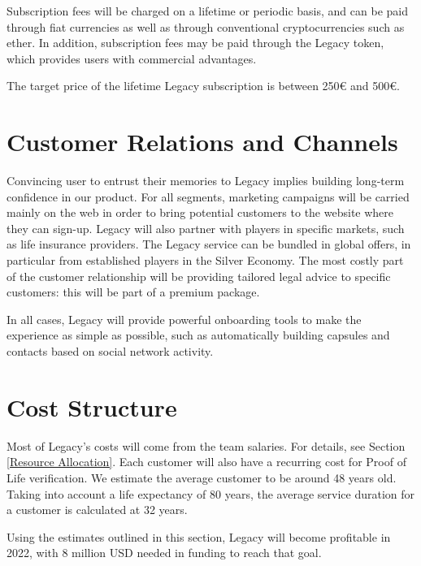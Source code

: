 Subscription fees will be charged on a lifetime or periodic basis, and can be paid through fiat currencies as well as through conventional cryptocurrencies such as ether. In addition, subscription fees may be paid through the Legacy token, which provides users with commercial advantages.

The target price of the lifetime Legacy subscription is between 250€ and 500€.

\section{Customer Relations and Channels} %
\label{sec:customer_relations_and_channels}
Convincing user to entrust their memories to Legacy implies building long-term confidence in our product.
For all segments, marketing campaigns will be carried mainly on the web in order to bring potential customers to the website where they can sign-up.
Legacy will also partner with players in specific markets, such as life insurance providers. The Legacy service can be bundled in global offers, in particular from established players in the Silver Economy.
The most costly part of the customer relationship will be providing tailored legal advice to specific customers: this will be part of a premium package.

In all cases, Legacy will provide powerful onboarding tools to make the experience as simple as possible, such as automatically building capsules and contacts based on social network activity.

\section{Cost Structure} %
\label{sec:cost_structure}
Most of Legacy’s costs will come from the team salaries. For details, see Section \ref{Resource Allocation}.
Each customer will also have a recurring cost for Proof of Life verification. We estimate the average customer to be around 48 years old. Taking into account a life expectancy of 80 years, the average service duration for a customer is calculated at 32 years.

Using the estimates outlined in this section, Legacy will become profitable in 2022, with 8 million USD needed in funding to reach that goal.


